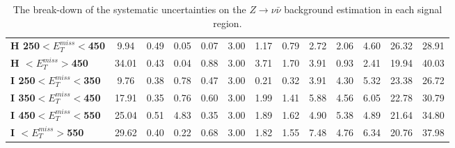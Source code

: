 \begin{table}[h]
\begin{center}
{\begin{tabular}{|l|cccccccccccc|}
\textbf{ H 250$<E_T^{miss}<$450}         & 9.94          & 0.49          & 0.05          & 0.07          & 3.00          & 1.17          & 0.79          & 2.72          & 2.06          & 4.60          & 26.32         & 28.91         \\
\textbf{ H $<E_T^{miss}>$450}    & 34.01         & 0.43          & 0.04          & 0.88          & 3.00          & 3.71          & 1.70          & 3.91          & 0.93          & 2.41          & 19.94         & 40.03         \\
\textbf{ I 250$<E_T^{miss}<$350}         & 9.76          & 0.38          & 0.78          & 0.47          & 3.00          & 0.21          & 0.32          & 3.91          & 4.30          & 5.32          & 23.38         & 26.72         \\
\textbf{ I 350$<E_T^{miss}<$450}         & 17.91         & 0.35          & 0.76          & 0.60          & 3.00          & 1.99          & 1.41          & 5.88          & 4.56          & 6.05          & 22.78         & 30.79         \\
\textbf{ I 450$<E_T^{miss}<$550}         & 25.04         & 0.51          & 4.83          & 0.35          & 3.00          & 1.89          & 1.62          & 4.90          & 5.38          & 4.89          & 21.64         & 34.80         \\
\textbf{ I $<E_T^{miss}>$550}    & 29.62         & 0.40          & 0.22          & 0.68          & 3.00          & 1.82          & 1.55          & 7.48          & 4.76          & 6.34          & 20.76         & 37.98         \\
\hline
\end{tabular}}
\caption[Table caption text]{The break-down of the systematic uncertainties on the $Z \to \nu \bar{\nu}$ background estimation in each signal region.   }
\label{tab:SysZnunu}
\end{center}
\end{table}


